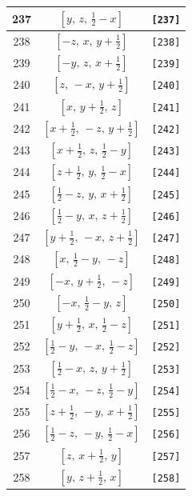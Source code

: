 \documentclass[fleqn,8pt]{jsarticle}
\begin{document}
\begin{longtable}{ccc}
237 & $\left[ y,\, z,\, \frac{1}{2} - x \right]$ & {\tt [237]} \\ \hline
238 & $\left[ - z,\, x,\, y + \frac{1}{2} \right]$ & {\tt [238]} \\ \hline
239 & $\left[ - y,\, z,\, x + \frac{1}{2} \right]$ & {\tt [239]} \\ \hline
240 & $\left[ z,\, - x,\, y + \frac{1}{2} \right]$ & {\tt [240]} \\ \hline
241 & $\left[ x,\, y + \frac{1}{2},\, z \right]$ & {\tt [241]} \\ \hline
242 & $\left[ x + \frac{1}{2},\, - z,\, y + \frac{1}{2} \right]$ & {\tt [242]} \\ \hline
243 & $\left[ x + \frac{1}{2},\, z,\, \frac{1}{2} - y \right]$ & {\tt [243]} \\ \hline
244 & $\left[ z + \frac{1}{2},\, y,\, \frac{1}{2} - x \right]$ & {\tt [244]} \\ \hline
245 & $\left[ \frac{1}{2} - z,\, y,\, x + \frac{1}{2} \right]$ & {\tt [245]} \\ \hline
246 & $\left[ \frac{1}{2} - y,\, x,\, z + \frac{1}{2} \right]$ & {\tt [246]} \\ \hline
247 & $\left[ y + \frac{1}{2},\, - x,\, z + \frac{1}{2} \right]$ & {\tt [247]} \\ \hline
248 & $\left[ x,\, \frac{1}{2} - y,\, - z \right]$ & {\tt [248]} \\ \hline
249 & $\left[ - x,\, y + \frac{1}{2},\, - z \right]$ & {\tt [249]} \\ \hline
250 & $\left[ - x,\, \frac{1}{2} - y,\, z \right]$ & {\tt [250]} \\ \hline
251 & $\left[ y + \frac{1}{2},\, x,\, \frac{1}{2} - z \right]$ & {\tt [251]} \\ \hline
252 & $\left[ \frac{1}{2} - y,\, - x,\, \frac{1}{2} - z \right]$ & {\tt [252]} \\ \hline
253 & $\left[ \frac{1}{2} - x,\, z,\, y + \frac{1}{2} \right]$ & {\tt [253]} \\ \hline
254 & $\left[ \frac{1}{2} - x,\, - z,\, \frac{1}{2} - y \right]$ & {\tt [254]} \\ \hline
255 & $\left[ z + \frac{1}{2},\, - y,\, x + \frac{1}{2} \right]$ & {\tt [255]} \\ \hline
256 & $\left[ \frac{1}{2} - z,\, - y,\, \frac{1}{2} - x \right]$ & {\tt [256]} \\ \hline
257 & $\left[ z,\, x + \frac{1}{2},\, y \right]$ & {\tt [257]} \\ \hline
258 & $\left[ y,\, z + \frac{1}{2},\, x \right]$ & {\tt [258]} \\ \hline

\end{longtable}
\end{document}
